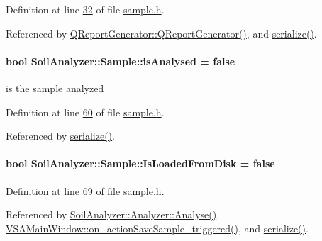 Definition at line \hyperlink{sample_8h_source_l00032}{32} of file \hyperlink{sample_8h_source}{sample.\+h}.



Referenced by \hyperlink{qreportgenerator_8cpp_source_l00004}{Q\+Report\+Generator\+::\+Q\+Report\+Generator()}, and \hyperlink{sample_8h_source_l00085}{serialize()}.

\hypertarget{class_soil_analyzer_1_1_sample_a7534ad473783de2ffd2b34c97ae86902}{}
\paragraph[{is\+Analysed}]{\setlength{\rightskip}{0pt plus 5cm}bool Soil\+Analyzer\+::\+Sample\+::is\+Analysed = false}\label{class_soil_analyzer_1_1_sample_a7534ad473783de2ffd2b34c97ae86902}
is the sample analyzed 

Definition at line \hyperlink{sample_8h_source_l00060}{60} of file \hyperlink{sample_8h_source}{sample.\+h}.



Referenced by \hyperlink{sample_8h_source_l00085}{serialize()}.

\hypertarget{class_soil_analyzer_1_1_sample_ad078b5aae9d86f5d8fc7ec871381b138}{}
\paragraph[{Is\+Loaded\+From\+Disk}]{\setlength{\rightskip}{0pt plus 5cm}bool Soil\+Analyzer\+::\+Sample\+::\+Is\+Loaded\+From\+Disk = false}\label{class_soil_analyzer_1_1_sample_ad078b5aae9d86f5d8fc7ec871381b138}


Definition at line \hyperlink{sample_8h_source_l00069}{69} of file \hyperlink{sample_8h_source}{sample.\+h}.



Referenced by \hyperlink{analyzer_8cpp_source_l00065}{Soil\+Analyzer\+::\+Analyzer\+::\+Analyse()}, \hyperlink{vsamainwindow_8cpp_source_l00460}{V\+S\+A\+Main\+Window\+::on\+\_\+action\+Save\+Sample\+\_\+triggered()}, and \hyperlink{sample_8h_source_l00085}{serialize()}.

